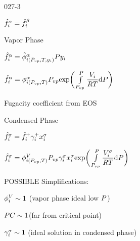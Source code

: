 \begin{mitframe}{027-3}
\begin{listone}
\item$\hat{\fug}_{\state}^{\tdiff}=\hat{\fug}_{\state}^{\texpcoeff}$

\item Vapor Phase

		\begin{listtwo}
        	\item$\hat{\fug}_{\state}^{\tdiff}=\hat{\eleccoeff}_{\state(\p_{vp},\Temp,y_{\state})}^{\tdiff}\p{y}_{\state}$
            
            \item$\hat{\fug}_{\state}^{\tdiff}=\eleccoeff_{\state(\p_{vp},\Temp)}^{\tdiff}\p_{vp}\text{exp}\bigg(\int\limits_{\p_{vp}}^{\p}\dfrac{\vol_{\state}}{\gasconst\Temp}\mathrm{d}\p\bigg)$

					\begin{listthree}
                    
                    \item Fugacity coefficient from EOS 

                    \end{listthree}
		\end{listtwo}
       

\item Condensed Phase
    
        \begin{listtwo}
         \item$\hat{\fug}_{\state}^{\molecrad}=\hat{\fug}_{\state}^{+}\actcoeff^{+}\specfrac{i}^{\molecrad}$
         
         \item$\hat{\fug}_{\state}^{\molecrad}=\eleccoeff_{\state(\p_{vp},\Temp)}^{\vol}\p_{vp}\actcoeff^{\molecrad}\specfrac{i}^{\molecrad}\text{exp}\bigg(\int\limits_{\p_{vp}}^{\p}\dfrac{\vol_{\state}^{\molecrad}}{\gasconst\Temp}\mathrm{d}\p\bigg)$
  				 \begin{listthree}
                 \item POSSIBLE Simplifications:

							\begin{listfour}
                            \item$\eleccoeff_{\state}^{\vol}\sim{1}$ (vapor phase ideal low $\p$)
                            \item$\p\conc\sim{1}$(far from critical point)
                            \item$\actcoeff^{\molecrad}\sim{1}$ (ideal solution in condensed phase)
                            

							\end{listfour}
				\end{listthree}   
   \end{listtwo}
        
        
        
        
\end{listone}
\end{mitframe}